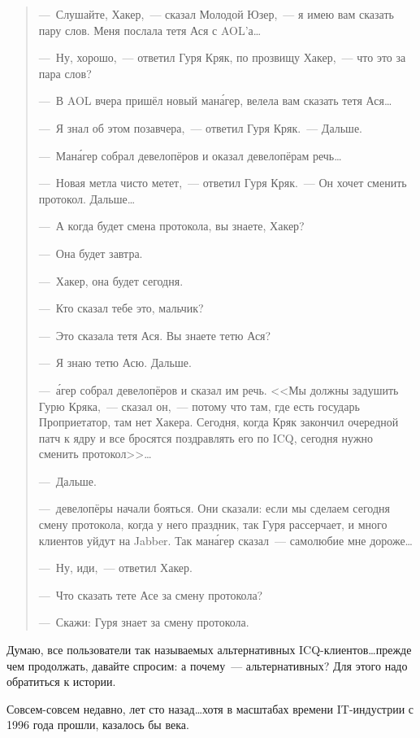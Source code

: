 \begin{quotation}
---~Слушайте, Хакер,~--- сказал Молодой Юзер,~--- я имею вам сказать пару слов. Меня послала тетя Ася с AOL'а\dots 

---~Ну, хорошо,~--- ответил Гуря Кряк, по прозвищу Хакер,~--- что это за пара слов? 

---~В AOL вчера пришёл новый ман\'{а}гер, велела вам сказать тетя Ася\dots 

---~Я знал об этом позавчера,~--- ответил Гуря Кряк.~--- Дальше. 

---~Ман\'{а}гер собрал девелопёров и оказал девелопёрам речь\dots 

---~Новая метла чисто метет,~--- ответил Гуря Кряк.~--- Он хочет сменить протокол. Дальше\dots 

---~А когда будет смена протокола, вы знаете, Хакер? 

---~Она будет завтра. 

---~Хакер, она будет сегодня. 

---~Кто сказал тебе это, мальчик? 

---~Это сказала тетя Ася. Вы знаете тетю Ася? 

---~Я знаю тетю Асю. Дальше. 

---~\'{а}гер собрал девелопёров и сказал им речь. <<Мы должны задушить Гурю Кряка,~--- сказал он,~--- потому что там, где есть государь Проприетатор, там нет Хакера. Сегодня, когда Кряк закончил очередной патч к ядру и все бросятся поздравлять его по ICQ, сегодня нужно сменить протокол>>\dots

---~Дальше. 

---~ девелопёры начали бояться. Они сказали: если мы сделаем сегодня смену протокола, когда у него праздник, так Гуря рассерчает, и много клиентов уйдут на Jabber. Так ман\'{а}гер сказал~--- самолюбие мне дороже\dots 

---~Ну, иди,~--- ответил Хакер. 

---~Что сказать тете Асе за смену протокола? 

---~Скажи: Гуря знает за смену протокола.
\end{quotation}



Думаю, все пользователи так называемых альтернативных ICQ-клиентов\dots прежде чем продолжать, давайте спросим: а почему~--- альтернативных? Для этого надо обратиться к истории. 

Совсем-совсем недавно, лет сто назад\dots хотя в масштабах времени IT-индустрии с 1996 года прошли, казалось бы века. 


